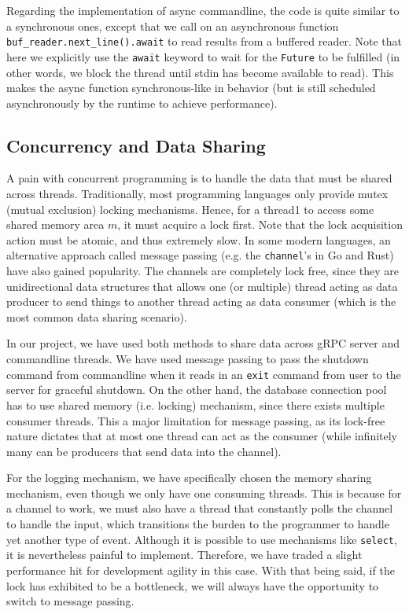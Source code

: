 \documentclass[letterpaper,11pt,twocolumn]{article}
\begin{document}
Regarding the implementation of async commandline, the code is quite similar to a synchronous ones, except that we call on an asynchronous function \texttt{buf\_reader.next\_line().await} to read results from a buffered reader. Note that here we explicitly use the \texttt{await} keyword to wait for the \texttt{Future} to be fulfilled (in other words, we block the thread until stdin has become available to read). This makes the async function synchronous-like in behavior (but is still scheduled asynchronously by the runtime to achieve performance).

\subsection{Concurrency and Data Sharing}

A pain with concurrent programming is to handle the data that must be shared across threads.
Traditionally, most programming languages only provide mutex (mutual exclusion) locking mechanisms. 
Hence, for a thread1 to access some shared memory area $m$, it must acquire a lock first. Note that the lock acquisition action must be atomic, and thus extremely slow.
In some modern languages, an alternative approach called message passing (e.g. the \texttt{channel}'s in Go and Rust) have also gained popularity. The channels are completely lock free, since they are unidirectional data structures that allows one (or multiple) thread acting as data producer to send things to another thread acting as data consumer (which is the most common data sharing scenario).

In our project, we have used both methods to share data across gRPC server and commandline threads. We have used message passing to pass the shutdown command from commandline when it reads in an \texttt{exit} command from user to the server for graceful shutdown. On the other hand, the database connection pool has to use shared memory (i.e. locking) mechanism, since there exists multiple consumer threads. This a major limitation for message passing, as its lock-free nature dictates that at most one thread can act as the consumer (while infinitely many can be producers that send data into the channel).

For the logging mechanism, we have specifically chosen the memory sharing mechanism, even though we only have one consuming threads. This is because for a channel to work, we must also have a thread that constantly polls the channel to handle the input, which transitions the burden to the programmer to handle yet another type of event. Although it is possible to use mechanisms like \texttt{select}, it is nevertheless painful to implement. 
Therefore, we have traded a slight performance hit for development agility in this case. With that being said, if the lock has exhibited to be a bottleneck, we will always have the opportunity to switch to message passing. 
\end{document}
